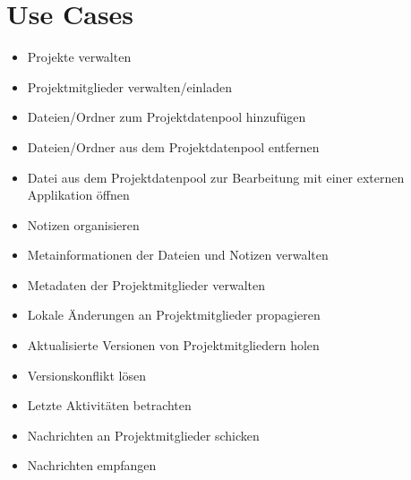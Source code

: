 
\section{Use Cases}


\begin{itemize}
\item Projekte verwalten
\item Projektmitglieder verwalten/einladen
\item Dateien/Ordner zum Projektdatenpool hinzufügen
\item Dateien/Ordner aus dem Projektdatenpool entfernen
\item Datei aus dem Projektdatenpool zur Bearbeitung mit einer externen Applikation öffnen
\item Notizen organisieren
\item Metainformationen der Dateien und Notizen verwalten
\item Metadaten der Projektmitglieder verwalten
\item Lokale Änderungen an Projektmitglieder propagieren
\item Aktualisierte Versionen von Projektmitgliedern holen
\item Versionskonflikt lösen
\item Letzte Aktivitäten betrachten
\item Nachrichten an Projektmitglieder schicken
\item Nachrichten empfangen
\end{itemize}
